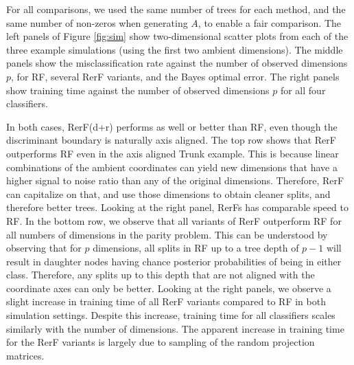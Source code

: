 \documentclass{article} %
\begin{document}
For all comparisons, we used the same number of trees for each method, and the same number of non-zeros when generating $A$, to enable a fair comparison.   The left panels of Figure \ref{fig:sim} show two-dimensional scatter plots from each of the three example simulations (using the first two ambient dimensions). The middle panels show the misclassification rate against the number of observed dimensions $p$,  for RF, several RerF  variants, and the Bayes optimal error.  The right panels show training time against the number of observed dimensions $p$ for all four classifiers.

In both cases, RerF(d+r) performs as well or better than RF, even though  the discriminant boundary is naturally axis aligned.  
The top row shows that  RerF outperforms RF even in the axis aligned Trunk example.
This is because  linear combinations of the ambient coordinates can yield new dimensions that have a higher signal to noise ratio than any of the original dimensions.  Therefore, RerF can capitalize on that, and use those dimensions to obtain cleaner splits, and therefore better trees.  
Looking at the right panel, RerFs has comparable speed to RF.
In the bottom row, we observe that all variants of RerF outperform RF for all numbers of dimensions in the parity problem. This can be understood by observing that for $p$ dimensions, all splits in RF up to a tree depth of $p - 1$ will result in daughter nodes having chance posterior probabilities of being in either class. Therefore, any splits up to this depth that are not aligned with the coordinate axes can only be better. 
Looking at the right panels, we observe a slight increase in training time of all RerF variants compared to RF in both simulation settings. Despite this increase, training time for all classifiers scales similarly with the number of dimensions. The apparent increase in training time for the RerF variants is largely due to sampling of the random projection matrices. 
\end{document}
